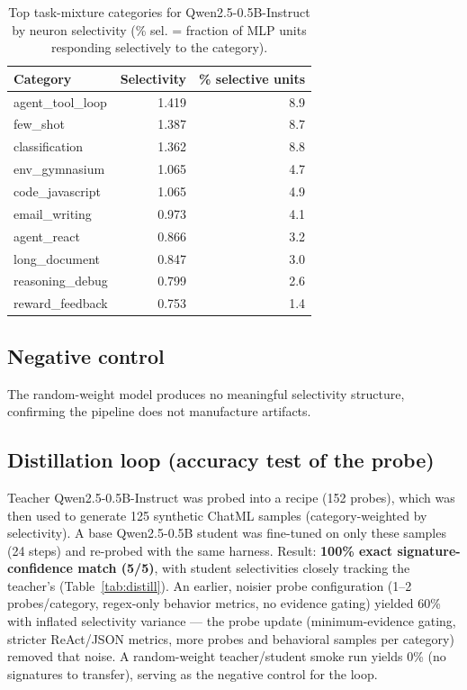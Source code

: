 \documentclass[11pt]{article}
\begin{document}
\begin{table}[h]
\centering
\caption{Top task-mixture categories for Qwen2.5-0.5B-Instruct by neuron selectivity
(\% sel. = fraction of MLP units responding selectively to the category).}
\label{tab:mixture}
\begin{tabular}{lrr}
\toprule
Category & Selectivity & \% selective units \\
\midrule
agent\_tool\_loop & 1.419 & 8.9 \\
few\_shot & 1.387 & 8.7 \\
classification & 1.362 & 8.8 \\
env\_gymnasium & 1.065 & 4.7 \\
code\_javascript & 1.065 & 4.9 \\
email\_writing & 0.973 & 4.1 \\
agent\_react & 0.866 & 3.2 \\
long\_document & 0.847 & 3.0 \\
reasoning\_debug & 0.799 & 2.6 \\
reward\_feedback & 0.753 & 1.4 \\
\bottomrule
\end{tabular}
\end{table}

\subsection{Negative control}
The random-weight model produces no meaningful selectivity structure, confirming the
pipeline does not manufacture artifacts.

\subsection{Distillation loop (accuracy test of the probe)}
Teacher Qwen2.5-0.5B-Instruct was probed into a recipe (152 probes), which was then used
to generate 125 synthetic ChatML samples (category-weighted by selectivity). A base
Qwen2.5-0.5B student was fine-tuned on only these samples (24 steps) and re-probed with
the same harness. Result: \textbf{100\% exact signature-confidence match (5/5)}, with
student selectivities closely tracking the teacher's (Table~\ref{tab:distill}). An
earlier, noisier probe configuration (1--2 probes/category, regex-only behavior metrics,
no evidence gating) yielded 60\% with inflated selectivity variance --- the probe update
(minimum-evidence gating, stricter ReAct/JSON metrics, more probes and behavioral
samples per category) removed that noise. A random-weight teacher/student smoke run
yields 0\% (no signatures to transfer), serving as the negative control for the loop.
\end{document}
